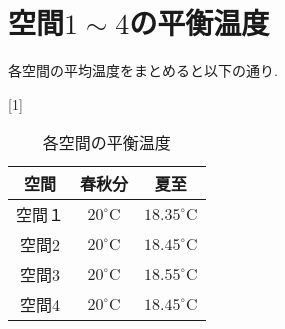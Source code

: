 \documentclass[15pt,uplatex,dvipdfmx]{jsarticle}
\begin{document}
\section{空間$1 \sim 4$の平衡温度}
各空間の平均温度をまとめると以下の通り.
\begin{table}[H]
  \begin{center}
  \caption{各空間の平衡温度}
  \scalebox{1}[1]{
  \begin{tabular}{|c|c|c|} \hline
    空間 &  春秋分 & 夏至 \\ \hline

  空間１
  & ${20}^\circ\mathrm{C}$
  & ${18.35}^\circ\mathrm{C}$\\

  空間2
  & ${20}^\circ\mathrm{C}$
  & ${18.45}^\circ\mathrm{C}$\\

  空間3
  & ${20}^\circ\mathrm{C}$
  & ${18.55}^\circ\mathrm{C}$\\

  空間4
  & ${20}^\circ\mathrm{C}$
  & ${18.45}^\circ\mathrm{C}$\\\hline
  \end{tabular}
  }
\end{center}
\end{table}
\end{document}
